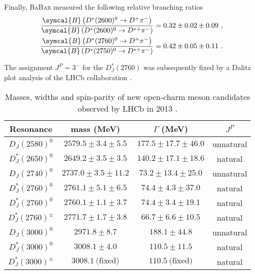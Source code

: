 Finally, \textsc{BaBar} measured the following relative branching ratios
\begin{subequations}
  \begin{align}
    \frac{\symcal{B} \left( D^*(2600)^0 \to D^+ \pi^- \right)}{\symcal{B} \left(  D^*(2600)^0 \to D^{* +} \pi^- \right)} &= 0.32 \pm 0.02 \pm 0.09 \ , \\
    \frac{\symcal{B} \left( D^*(2760)^0 \to D^+ \pi^- \right)}{\symcal{B} \left(  D^*(2750)^0 \to D^{* +} \pi^- \right)} &= 0.42 \pm 0.05 \pm 0.11 \ .
  \end{align}
\end{subequations}

The assignment $J^P = 3^-$ for the $D^*_J(2760)$ was subsequently fixed by a Dalitz plot analysis of the LHCb collaboration \cite{Aaij:2015sqa}.

\begin{table}
  \centering
  \begin{tabular}{c c c c}
    \toprule
    Resonance & mass (MeV) & $\Gamma$ (MeV) & $J^P$ \\ 
    \midrule
    $D_J(2580)^0$     & $2579.5 \pm 3.4 \pm 5.5$  & $177.5 \pm 17.7 \pm 46.0$ & unnatural \\
    \addlinespace
    $D^*_J(2650)^0$   & $2649.2 \pm 3.5 \pm 3.5$  & $140.2 \pm 17.1 \pm 18.6$ & natural \\
    \addlinespace
    $D_J(2740)^0$     & $2737.0 \pm 3.5 \pm 11.2$ & $73.2 \pm 13.4 \pm 25.0$  & unnatural \\
    \addlinespace
    $D^*_J(2760)^0$   & $2761.1 \pm 5.1 \pm 6.5$  & $74.4 \pm 4.3 \pm 37.0$   & natural \\
    $D^*_J(2760)^0$   & $2760.1 \pm 1.1 \pm 3.7$  & $74.4 \pm 3.4 \pm 19.1$   & natural \\
    $D^*_J(2760)^\pm$ & $2771.7 \pm 1.7 \pm 3.8$  & $66.7 \pm 6.6 \pm 10.5$   & natural \\
    \addlinespace
    $D_J(3000)^0$     & $2971.8 \pm 8.7$          & $188.1 \pm 44.8$          & unnatural \\
    \addlinespace
    $D^*_J(3000)^0$   & $3008.1 \pm 4.0$          & $110.5 \pm 11.5$          & natural \\
    $D^*_J(3000)^\pm$ & $3008.1 \ \text{(fixed)}$ & $110.5 \ \text{(fixed)}$  & natural \\
    \bottomrule
  \end{tabular}
  \caption{Masses, widths and spin-parity of new open-charm meson candidates observed by LHCb in 2013 \cite{Aaij:2013sza}.}
  \label{tab:LHCb_2013}
\end{table}

